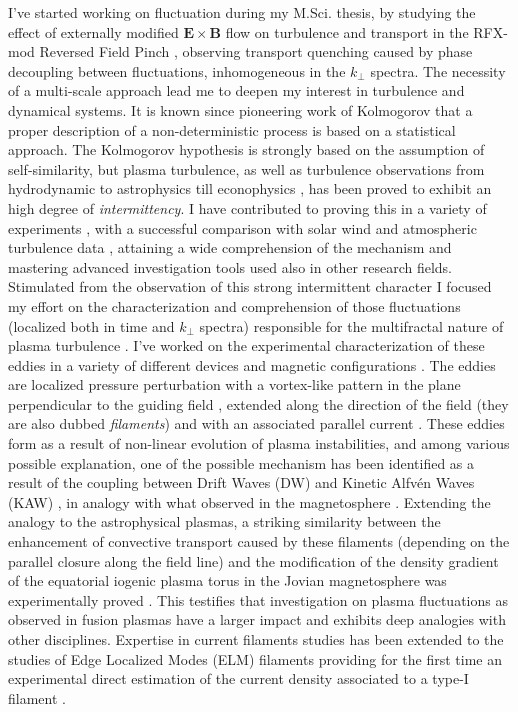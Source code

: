 \documentclass[12pt,a4paper]{article}
\begin{document}
I've started working on fluctuation during my M.Sci. thesis, by
studying the effect of externally modified $\mathbf{E}\times\mathbf{B}$
flow on turbulence and transport in the RFX-mod Reversed Field Pinch
\cite{Antoni:2000p3587}, observing transport quenching caused by
phase decoupling between fluctuations,  inhomogeneous in the
$k_{\perp}$ spectra. The necessity of a multi-scale approach lead me to deepen my
interest in turbulence and dynamical systems. It is known since
pioneering work of Kolmogorov \cite{Frisch:1996ue} that a proper
description of a non-deterministic process is based on a statistical
approach.  The Kolmogorov hypothesis is strongly based on the
assumption of self-similarity, but plasma turbulence, as well as turbulence observations from hydrodynamic to
astrophysics till econophysics \cite{Sornette:2006dt}, has been proved
to exhibit an high degree of \emph{intermittency}. I have contributed
to proving this in a variety of experiments
\cite{Antoni:2001p662,Vianello:2002p3579}, with a successful comparison 
with solar wind and atmospheric turbulence data
\cite{Carbone:2002p2809}, attaining a wide comprehension of the
mechanism and mastering advanced investigation tools used also in other research
fields. Stimulated from the observation of this strong intermittent
character I focused my effort on the characterization and
comprehension of those fluctuations (localized both in time and
$k_{\perp}$ spectra) responsible for the multifractal nature of plasma turbulence
\cite{Bohr:1998fn}. I've worked on the experimental characterization
of these eddies in a variety
of different devices and magnetic configurations
\cite{Spolaore:2009p4115,Vianello:2010p4670,Furno:2011cs,Spolaore:2015ij}. The
eddies are localized pressure perturbation with a vortex-like pattern in
the plane perpendicular to the guiding field \cite{Antoni:2006p3585},
extended along the direction of the field (they are also dubbed \emph{filaments})
and with an associated parallel current
\cite{Spolaore:2009p4115,Vianello:2010p4670}. These eddies form as a
result of non-linear evolution of plasma instabilities, and among
various possible explanation,  one of the possible mechanism has been identified as a result
of the coupling between Drift Waves (DW) and Kinetic Alfv{\'e}n Waves
(KAW) \cite{Vianello:2010p4670}, in analogy with what observed in the
magnetosphere \cite{Martines:2009p4483,Sundkvist:2005is}. Extending
the analogy to the astrophysical plasmas, a striking similarity
between the enhancement of convective transport caused by these
filaments (depending on the parallel closure along the field line) and
the modification of the density gradient of the equatorial iogenic
plasma torus in the Jovian magnetosphere \cite{Frank:2002eu} was 
experimentally proved \cite{carralero:prl2015}. This testifies that investigation on
plasma fluctuations as observed in fusion plasmas have a
larger impact and exhibits deep analogies with other disciplines. 
Expertise in
current filaments studies has been extended to the studies of Edge
Localized Modes (ELM)
filaments providing for the first time an experimental direct estimation of the
current density associated to a type-I filament
\cite{PhysRevLett.106.125002,Naulin:2011im,Muller:2011kj,Spolaore:2015tk}.
\end{document}
